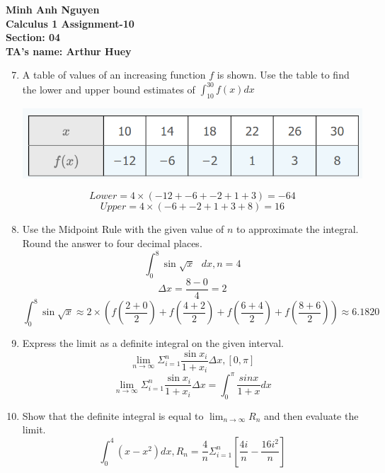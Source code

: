 \documentclass[12pt]{article}
\begin{document}
\textbf{Minh Anh Nguyen }\\
\textbf{Calculus 1 Assignment-10}\\
\textbf{Section: 04}\\
\textbf{TA's name: Arthur Huey}

\hrulefill

\begin{enumerate}
\setcounter{enumi}{6}
    \item A table of values of an increasing function $f$ is shown. Use the table to find the lower and upper bound estimates of $\int_{10}^{30} f(x)dx$
    \begin{center}
        \includegraphics[scale=0.5]{img/img-0.png}
    \end{center}
    \[Lower = 4\times(-12 + -6 + -2 + 1 + 3) = -64\]
    \[Upper = 4\times(-6 + -2 + 1 + 3 + 8) = 16\]
\setcounter{enumi}{10}
    \item Use the Midpoint Rule with the given value of $n$ to approximate the integral. Round the answer to four decimal places.
    \[\int_{0}^{8} \sin \sqrt{x} \text{ } dx, n = 4\]
    \[\Delta x = \frac{8-0}{4} = 2\]
    \[\int_{0}^{8} \sin \sqrt{x} \approx 2 \times (f(\frac{2+0}{2}) + f(\frac{4+2}{2}) + f(\frac{6+4}{2}) + f(\frac{8+6}{2})) \approx 6.1820\]
\setcounter{enumi}{18}
    \item Express the limit as a definite integral on the given interval.
    \[\lim_{n \to \infty} \Sigma_{i=1}^{n} \frac{\sin x_i}{1 + x_i}\Delta x, [0,\pi]\]
    \[\lim_{n \to \infty} \Sigma_{i=1}^{n} \frac{\sin x_i}{1 + x_i}\Delta x = \int_{0}^{\pi} \frac{sin x}{1 + x} dx\]
\setcounter{enumi}{22} 
    \item Show that the definite integral is equal to $\lim_{n \to \infty} R_n$ and then evaluate the limit.
    \[\int_{0}^{4}(x-x^2)dx, R_n = \frac{4}{n} \Sigma_{i = 1}^{n}[\frac{4i}{n} - \frac{16i^2}{n}]\]

\end{enumerate}
\end{document}
